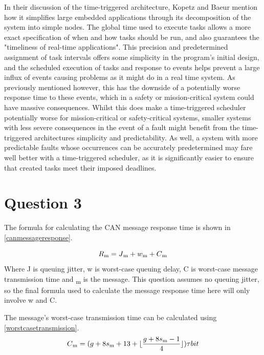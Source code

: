 \documentclass[]{report}
\begin{document}
			In their discussion of the time-triggered architecture, Kopetz and Baeur\cite{kopetz2003time} mention how it simplifies large embedded applications through its decomposition of the system into simple nodes. The global time used to execute tasks allows a more exact specification of when and how tasks should be run, and also guarantees the "timeliness of real-time applications". This precision and predetermined assignment of task intervals offers some simplicity in the program's initial design, and the scheduled execution of tasks and response to events helps prevent a large influx of events causing problems as it might do in a real time system. As previously mentioned however, this has the downside of a potentially worse response time to these events, which in a safety or mission-critical system could have massive consequences. Whilst this does make a time-triggered scheduler potentially worse for mission-critical or safety-critical systems, smaller systems with less severe consequences in the event of a fault might benefit from the time-triggered architectures simplicity and predictability. As well, a system with more predictable faults whose occurrences can be accurately predetermined may fare well better with a time-triggered scheduler, as it is significantly easier to ensure that created tasks meet their imposed deadlines.
		
		\section{Question 3}
		The formula for calculating the CAN message response time is shown in \ref{canmessageresponse}.
		
		\begin{equation}
		\label{canmessageresponse}
		R\textsubscript{m} = J\textsubscript{m} + w\textsubscript{m} + C\textsubscript{m}
		\end{equation}
		Where J is queuing jitter, w is worst-case queuing delay, C is worst-case message transmission time and \textsubscript{m} is the message. This question assumes no queuing jitter, so the final formula used to calculate the message response time here will only involve w and C.
		\medskip
		
		The message's worst-case transmission time can be calculated using \ref{worstcasetransmission}.
		\begin{equation}
		\label{worstcasetransmission}
		C\textsubscript{m} = (g + 8s\textsubscript{m} + 13 + \lfloor \frac{g + 8s\textsubscript{m} - 1}{4} \rfloor ) \tau bit
		\end{equation}
		
\end{document}
